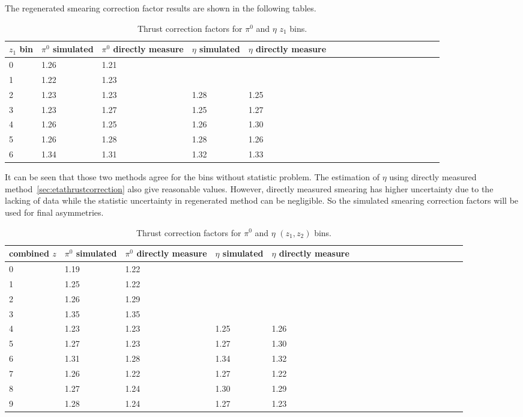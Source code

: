 The regenerated smearing correction factor results are shown in the following tables.%
\begin{table}[H]\footnotesize
\centering
\begin{tabular}{|l|l|l|l|l|l|l|l|l|l|l|l|l|l|l|l|l|l|}
\hline
$z_1$ bin & $\pi^0$ simulated & $\pi^0$ directly measure & $\eta$ simulated  & $\eta$ directly measure  \\ \hline
0	&	1.26	&	1.21	&		&		\\ \hline
1	&	1.22	&	1.23	&		&		\\ \hline
2	&	1.23	&	1.23	&	1.28	&	1.25	\\ \hline
3	&	1.23	&	1.27	&	1.25	&	1.27	\\ \hline
4	&	1.26	&	1.25	&	1.26	&	1.30	\\ \hline
5	&	1.26	&	1.28	&	1.28	&	1.26	\\ \hline
6	&	1.34	&	1.31	&	1.32	&	1.33	\\ \hline

\end{tabular}
\caption{Thrust correction factors for $\pi^0$ and $\eta$ $z_1$ bins.}
\label{tab:sinzthrustfactor_compare}
\end{table}
It can be seen that those two methods agree for the bins without statistic problem. The estimation of $\eta$ using directly measured method~\ref{sec:etathrustcorrection} also give reasonable values. However, directly measured smearing has higher uncertainty due to the lacking of data while the statistic uncertainty in regenerated method can be negligible. So the simulated smearing correction factors will be used for final asymmetries. 
\begin{table}[H]\footnotesize
\centering
\begin{tabular}{|l|l|l|l|l|l|l|l|l|l|l|l|l|l|l|l|l|l|}
\hline
combined $z$ & $\pi^0$ simulated & $\pi^0$ directly measure & $\eta$ simulated  & $\eta$ directly measure  \\ \hline
0	&	1.19	&	1.22	&		&		\\ \hline
1	&	1.25	&	1.22	&		&		\\ \hline
2	&	1.26	&	1.29	&		&		\\ \hline
3	&	1.35	&	1.35	&		&		\\ \hline
4	&	1.23	&	1.23	&	1.25	&	1.26	\\ \hline
5	&	1.27	&	1.23	&	1.27	&	1.30	\\ \hline
6	&	1.31	&	1.28	&	1.34	&	1.32	\\ \hline
7	&	1.26	&	1.22	&	1.27	&	1.22	\\ \hline
8	& 	1.27	&	1.24	&	1.30	&	1.29	\\ \hline
9	&	1.28	&	1.24	&	1.27	&	1.23	\\ \hline
\end{tabular}
\caption{Thrust correction factors for $\pi^0$ and $\eta$ $(z_1,z_2)$ bins.}
\label{tab:comzthrustfactor_compare}
\end{table}
